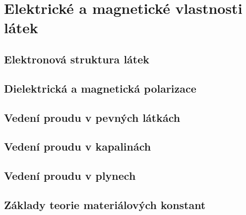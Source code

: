 \graphicspath{{../src/FYZ/img/}}
\setchaptertoc
\chapter{Elektrické a magnetické vlastnosti látek}\label{fyz:IIIchapVII}
  \section{Elektronová struktura látek}\label{fyz:IIIchapVIIsecI}
  \section{Dielektrická a magnetická polarizace}\label{fyz:IIIchapVIIsecII}
  \section{Vedení proudu v pevných látkách}\label{fyz:IIIchapVIIsecIII}
  \section{Vedení proudu v kapalinách}\label{fyz:IIIchapVIIsecIV}
  \section{Vedení proudu v plynech}\label{fyz:IIIchapVIIsecV}
  \section{Základy teorie materiálových konstant}\label{fyz:IIIchapVIIsecVI}

